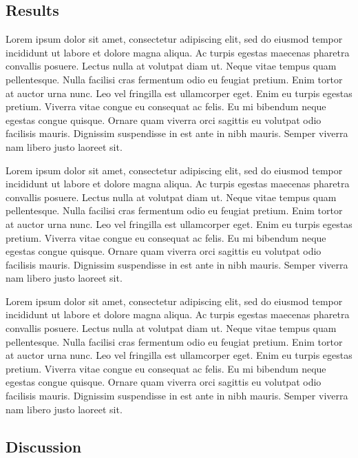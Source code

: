 \documentclass[
  twocolumn]{article}
\begin{document}
\hypertarget{results}{%
\subsection{Results}\label{results}}

Lorem ipsum dolor sit amet, consectetur adipiscing elit, sed do eiusmod
tempor incididunt ut labore et dolore magna aliqua. Ac turpis egestas
maecenas pharetra convallis posuere. Lectus nulla at volutpat diam ut.
Neque vitae tempus quam pellentesque. Nulla facilisi cras fermentum odio
eu feugiat pretium. Enim tortor at auctor urna nunc. Leo vel fringilla
est ullamcorper eget. Enim eu turpis egestas pretium. Viverra vitae
congue eu consequat ac felis. Eu mi bibendum neque egestas congue
quisque. Ornare quam viverra orci sagittis eu volutpat odio facilisis
mauris. Dignissim suspendisse in est ante in nibh mauris. Semper viverra
nam libero justo laoreet sit.

Lorem ipsum dolor sit amet, consectetur adipiscing elit, sed do eiusmod
tempor incididunt ut labore et dolore magna aliqua. Ac turpis egestas
maecenas pharetra convallis posuere. Lectus nulla at volutpat diam ut.
Neque vitae tempus quam pellentesque. Nulla facilisi cras fermentum odio
eu feugiat pretium. Enim tortor at auctor urna nunc. Leo vel fringilla
est ullamcorper eget. Enim eu turpis egestas pretium. Viverra vitae
congue eu consequat ac felis. Eu mi bibendum neque egestas congue
quisque. Ornare quam viverra orci sagittis eu volutpat odio facilisis
mauris. Dignissim suspendisse in est ante in nibh mauris. Semper viverra
nam libero justo laoreet sit.

Lorem ipsum dolor sit amet, consectetur adipiscing elit, sed do eiusmod
tempor incididunt ut labore et dolore magna aliqua. Ac turpis egestas
maecenas pharetra convallis posuere. Lectus nulla at volutpat diam ut.
Neque vitae tempus quam pellentesque. Nulla facilisi cras fermentum odio
eu feugiat pretium. Enim tortor at auctor urna nunc. Leo vel fringilla
est ullamcorper eget. Enim eu turpis egestas pretium. Viverra vitae
congue eu consequat ac felis. Eu mi bibendum neque egestas congue
quisque. Ornare quam viverra orci sagittis eu volutpat odio facilisis
mauris. Dignissim suspendisse in est ante in nibh mauris. Semper viverra
nam libero justo laoreet sit.

\hypertarget{discussion}{%
\subsection{Discussion}\label{discussion}}
\end{document}
